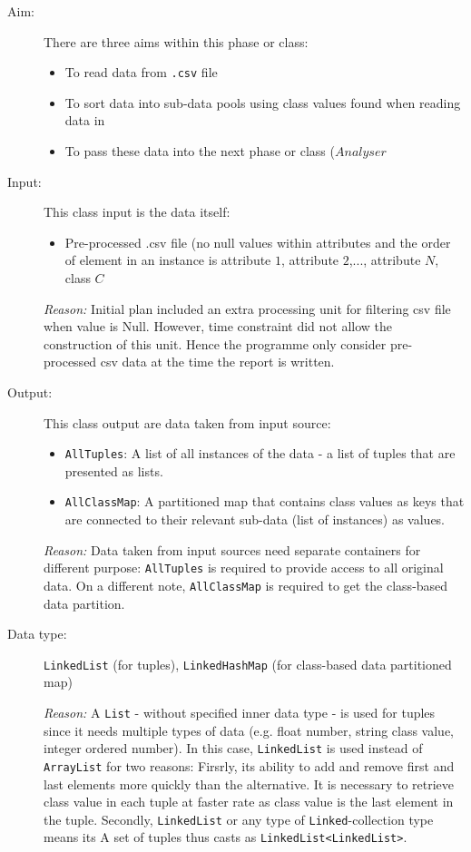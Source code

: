 \begin{description}

\item[Aim: ] There are three aims within this phase or class:
\begin{itemize}
	\item{To read data from \texttt{.csv} file} 
	\item{To sort data into sub-data pools using class values found when reading data in} 
	\item{To pass these data into the next phase or class ($Analyser$} 
\end{itemize}

\item[Input: ] This class input is the data itself:
\begin{itemize}
	\item{Pre-processed .csv file (no null values within attributes and the order of element in an instance is {attribute $1$, attribute $2$,..., attribute $N$, class $C$}}
\end{itemize} 

\textit{Reason: } Initial plan included an extra processing unit for filtering csv file when value is Null. However, time constraint did not allow the construction of this unit. Hence the programme only consider pre-processed csv data at the time the report is written.

\item[Output: ] This class output are data taken from input source:
\begin{itemize}
	\item{\texttt{AllTuples}: A list of all instances of the data - a list of tuples that are presented as lists.}
	\item{\texttt{AllClassMap}: A partitioned map that contains class values as keys that are connected to their relevant sub-data (list of instances) as values.}
\end{itemize}
  
\textit{Reason: } Data taken from input sources need separate containers for different purpose: \texttt{AllTuples} is required to provide access to all original data. On a different note, \texttt{AllClassMap} is required to get the class-based data partition.

\item[Data type: ] \texttt{LinkedList} (for tuples), \texttt{LinkedHashMap} (for class-based data partitioned map)

\textit{Reason: } A \texttt{List} - without specified inner data type - is used for tuples since it needs multiple types of data (e.g. float number, string class value, integer ordered number). In this case, \texttt{LinkedList} is used instead of \texttt{ArrayList} for two reasons: Firsrly, its ability to add and remove first and last elements more quickly than the alternative. It is necessary to retrieve class value in each tuple at faster rate as class value is the last element in the tuple. Secondly, \texttt{LinkedList} or any type of \texttt{Linked}-collection type means its  A set of tuples thus casts as \texttt{LinkedList<LinkedList>}.


\end{description}
